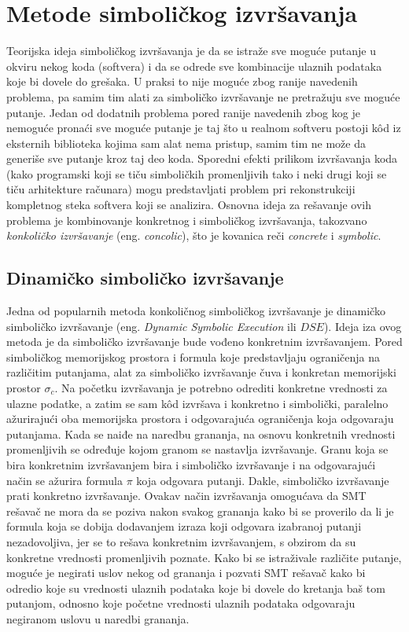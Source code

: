 \documentclass[12pt,oneside]{memoir}
\begin{document}
\section{Metode simboličkog izvršavanja}
Teorijska ideja simboličkog izvršavanja je da se istraže sve moguće putanje u okviru nekog koda (softvera) i da se odrede sve kombinacije ulaznih podataka koje bi dovele do grešaka. U praksi to nije moguće zbog ranije navedenih problema, pa samim tim alati za simboličko izvršavanje ne pretražuju sve moguće putanje. Jedan od dodatnih problema pored ranije navedenih zbog kog je nemoguće pronaći sve moguće putanje je taj što u realnom softveru postoji k\^od iz eksternih biblioteka kojima sam alat nema pristup, samim tim ne može da generiše sve putanje kroz taj deo koda. Sporedni efekti prilikom izvršavanja koda (kako programski koji se tiču simboličkih promenljivih tako i neki drugi koji se tiču arhitekture računara) mogu predstavljati problem pri rekonstrukciji kompletnog steka softvera koji se analizira. Osnovna ideja za rešavanje ovih problema je kombinovanje konkretnog i simboličkog izvršavanja, takozvano \textit{konkoličko izvršavanje} (eng. \textit{concolic}), što je kovanica reči \textit{concrete} i \textit{symbolic}.

\subsection{Dinamičko simboličko izvršavanje}
Jedna od popularnih metoda konkoličnog simboličkog izvršavanje je dinamičko simboličko izvršavanje (eng. \textit{Dynamic Symbolic Execution} ili $DSE$). Ideja iza ovog metoda je da simboličko izvršavanje bude vođeno konkretnim izvršavanjem. Pored simboličkog memorijskog prostora i formula koje predstavljaju ograničenja na različitim putanjama, alat za simboličko izvršavanje čuva i konkretan memorijski prostor $\sigma_c$. Na početku izvršavanja je potrebno odrediti konkretne vrednosti za ulazne podatke, a zatim se sam k\^od izvršava i konkretno i simbolički, paralelno ažurirajući oba memorijska prostora i odgovarajuća ograničenja koja odgovaraju putanjama. Kada se naiđe na naredbu grananja, na osnovu konkretnih vrednosti promenljivih se određuje kojom granom se nastavlja izvršavanje. Granu koja se bira konkretnim izvršavanjem bira i simboličko izvršavanje i na odgovarajući način se ažurira formula $\pi$ koja odgovara putanji. Dakle, simboličko izvršavanje prati konkretno izvršavanje. Ovakav način izvršavanja omogućava da SMT rešavač ne mora da se poziva nakon svakog grananja kako bi se proverilo da li je formula koja se dobija dodavanjem izraza koji odgovara izabranoj putanji nezadovoljiva, jer se to rešava konkretnim izvršavanjem, s obzirom da su konkretne vrednosti promenljivih poznate. Kako bi se istraživale različite putanje, moguće je negirati uslov nekog od grananja i pozvati SMT rešavač kako bi odredio koje su vrednosti ulaznih podataka koje bi dovele do kretanja baš tom putanjom, odnosno koje početne vrednosti ulaznih podataka odgovaraju negiranom uslovu u naredbi grananja. 
\end{document}
